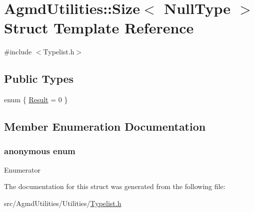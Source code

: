 \hypertarget{struct_agmd_utilities_1_1_size_3_01_null_type_01_4}{\section{Agmd\+Utilities\+:\+:Size$<$ Null\+Type $>$ Struct Template Reference}
\label{struct_agmd_utilities_1_1_size_3_01_null_type_01_4}
}


{\ttfamily \#include $<$Typelist.\+h$>$}

\subsection*{Public Types}
\begin{DoxyCompactItemize}
\item 
enum \{ \hyperlink{struct_agmd_utilities_1_1_size_3_01_null_type_01_4_a6e665ad96486cfb5e82f3afe01c82172a4799bd161d5a58f0085d07b94a603d1d}{Result} = 0
 \}
\end{DoxyCompactItemize}


\subsection{Member Enumeration Documentation}
\hypertarget{struct_agmd_utilities_1_1_size_3_01_null_type_01_4_a6e665ad96486cfb5e82f3afe01c82172}{\subsubsection[{anonymous enum}]{\setlength{\rightskip}{0pt plus 5cm}anonymous enum}}\label{struct_agmd_utilities_1_1_size_3_01_null_type_01_4_a6e665ad96486cfb5e82f3afe01c82172}
\begin{Desc}
\item[Enumerator]\par
\begin{description}
\item[{\em 
\hypertarget{struct_agmd_utilities_1_1_size_3_01_null_type_01_4_a6e665ad96486cfb5e82f3afe01c82172a4799bd161d5a58f0085d07b94a603d1d}{Result}\label{struct_agmd_utilities_1_1_size_3_01_null_type_01_4_a6e665ad96486cfb5e82f3afe01c82172a4799bd161d5a58f0085d07b94a603d1d}
}]\end{description}
\end{Desc}


The documentation for this struct was generated from the following file\+:\begin{DoxyCompactItemize}
\item 
src/\+Agmd\+Utilities/\+Utilities/\hyperlink{_typelist_8h}{Typelist.\+h}\end{DoxyCompactItemize}
